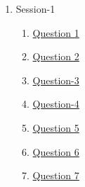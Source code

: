 \clearpage
\renewcommand{\notetitle}{Table of Contents}
\label{toc}
\begin{enumerate}

\item Session-1
\begin{enumerate}
\item \hyperref[202501120904]{Question 1}
\item \hyperref[202501121340]{Question 2}
\item \hyperref[202501121522]{Question-3}
\item \hyperref[202501121636]{Question-4}
\item \hyperref[202501121712]{Question 5}
\item \hyperref[202501121828]{Question 6}
\item \hyperref[202501121941]{Question 7}
\end{enumerate}
\end{enumerate}

\newpage
